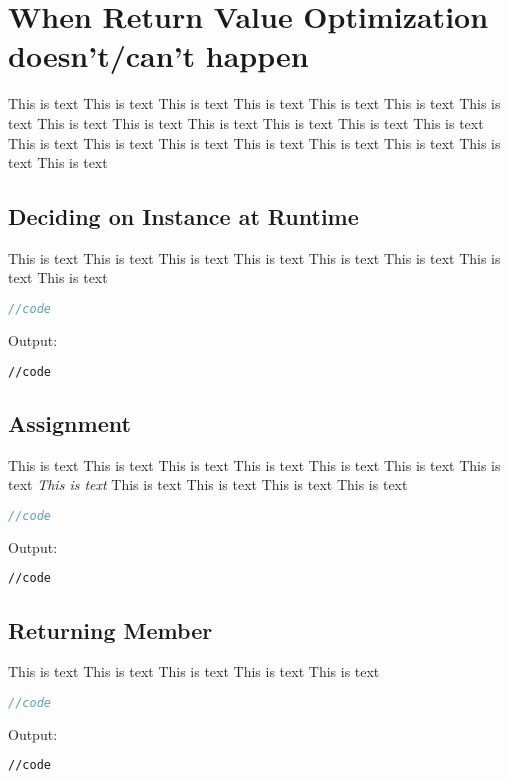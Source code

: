 \documentclass[a4paper]{uestcreport}
\begin{document}
\section{When Return Value Optimization doesn't/can't happen}
This is text This is text This is text This is text This is text This is text This is text This is text This is text This is text This is text This is text This is text This is text This is text This is text This is text This is text This is text This is text This is text 

\subsection{Deciding on Instance at Runtime}
This is text This is text This is text This is text This is text This is text This is text This is text 
\begin{lstlisting}[language=C++]
//code
\end{lstlisting}

Output:
\begin{lstlisting}[language=sh]
//code
\end{lstlisting}

\subsection{Assignment}
This is text This is text This is text This is text This is text This is text This is text  \textit{This is text } This is text This is text This is text This is text
\begin{lstlisting}[language=C++]
//code
\end{lstlisting}

Output:
\begin{lstlisting}[language=sh]
//code
\end{lstlisting}

\subsection{Returning Member}
This is text This is text This is text This is text This is text 
\begin{lstlisting}[language=C++]
//code
\end{lstlisting}

Output:
\begin{lstlisting}[language=sh]
//code
\end{lstlisting}

\newpage

\thispagestyle{fancy}
\fancyhead[L]{}
\fancyhead[R]{}
\setcounter{section}{0}
\end{document}
